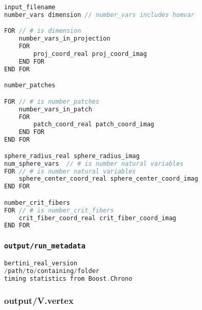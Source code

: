 \begin{center}\begin{minipage}{0.9\linewidth}
\begin{lstlisting}[language=c++, caption={\tt output/decomp}, captionpos=b]
input_filename
number_vars dimension // number_vars includes homvar

FOR // # is dimension
	number_vars_in_projection
	FOR
		proj_coord_real proj_coord_imag 
	END FOR
END FOR

number_patches

FOR // # is number_patches
	number_vars_in_patch
	FOR
		patch_coord_real patch_coord_imag 
	END FOR
END FOR

sphere_radius_real sphere_radius_imag
num_sphere_vars  // # is number natural variables
FOR // # is number natural variables
	sphere_center_coord_real sphere_center_coord_imag
END FOR

number_crit_fibers
FOR // # is number_crit_fibers
	crit_fiber_coord_real crit_fiber_coord_imag
END FOR
\end{lstlisting}
\end{minipage}\end{center}


\subsubsection{\tt output/run\_metadata}
\label{sec:run_metadata}

\begin{center}\begin{minipage}{0.9\linewidth}
\begin{lstlisting}[language=c++, caption={\tt output/decomp}, captionpos=b]
bertini_real_version
/path/to/containing/folder
timing statistics from Boost.Chrono
\end{lstlisting}
\end{minipage}\end{center}






\subsubsection{output/V.vertex}
\label{sec:v.vertex}


